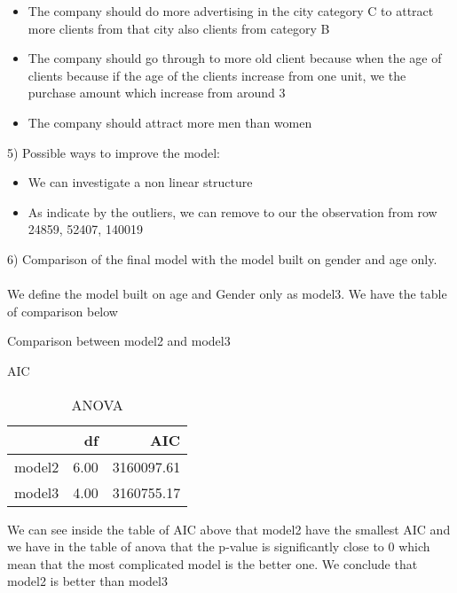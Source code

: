 \documentclass[11pt,a4paper]{article}
\begin{document}
\begin{itemize}
	\item The company should do more advertising in the city category C to attract more clients from that city also clients from category B
	\item The company should go through to more old client because when the age of clients because if the age of the clients increase from one unit, we the purchase amount which increase from around 3
	\item The company should attract more men than women
\end{itemize}
5) Possible ways to improve the model:
\begin{itemize}
	\item We can investigate a non linear structure
	\item As indicate by the outliers, we can remove to our the observation from row 24859, 52407, 140019
\end{itemize}
6) Comparison of the final model with the model built on gender and age only.\\
\\We define the model built on age and Gender only as model3. We have the table of comparison below
\begin{table}[H]
	\caption{Comparison between model2 and model3}
	\begin{subtable}{.5\linewidth}
		\centering
		\caption{AIC}
		 \begin{tabular}{rrr}
		 		\hline
		 		& df & AIC \\ 
		 		\hline
		 		model2 & 6.00 & 3160097.61 \\ 
		 		model3 & 4.00 & 3160755.17 \\ 
		 		\hline
		 	\end{tabular}
	\end{subtable} %
	\begin{subtable}{.5\linewidth}
		\centering
		\caption{ANOVA}
	 	\end{subtable} 
\end{table} 
We can see inside the table of AIC above that model2 have the smallest AIC and we have in the table of anova that the p-value is significantly close to 0 which mean that the most complicated model is the better one. We conclude that model2 is better than model3 
\end{document}
